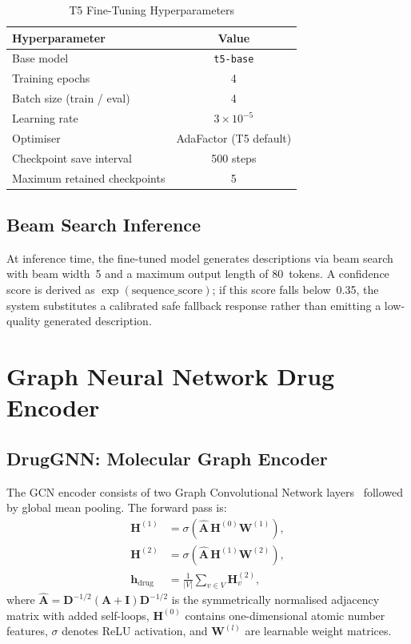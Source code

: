 \documentclass[12pt,a4paper,oneside]{report}
\begin{document}
\begin{table}[htbp]
\centering
\caption{T5 Fine-Tuning Hyperparameters}
\label{tab:t5hparams}
\begin{tabular}{lc}
\toprule
\textbf{Hyperparameter} & \textbf{Value} \\
\midrule
Base model                    & \texttt{t5-base}              \\
Training epochs               & 4                             \\
Batch size (train / eval)     & 4                             \\
Learning rate                 & $3 \times 10^{-5}$            \\
Optimiser                     & AdaFactor (T5 default)        \\
Checkpoint save interval      & 500 steps                     \\
Maximum retained checkpoints  & 5                             \\
\bottomrule
\end{tabular}
\end{table}

\subsection{Beam Search Inference}

At inference time, the fine-tuned model generates descriptions via beam search with beam
width~5 and a maximum output length of 80~tokens. A confidence score is derived as
$\exp(\text{sequence\_score})$; if this score falls below~0.35, the system substitutes a
calibrated safe fallback response rather than emitting a low-quality generated description.

\section{Graph Neural Network Drug Encoder}

\subsection{DrugGNN: Molecular Graph Encoder}

The GCN encoder consists of two Graph Convolutional Network layers~\cite{kipf2016semi}
followed by global mean pooling. The forward pass is:
\begin{align}
  \mathbf{H}^{(1)} &= \sigma\!\left(\hat{\mathbf{A}}\,\mathbf{H}^{(0)}\mathbf{W}^{(1)}\right),
  \label{eq:gcn1}\\
  \mathbf{H}^{(2)} &= \sigma\!\left(\hat{\mathbf{A}}\,\mathbf{H}^{(1)}\mathbf{W}^{(2)}\right),
  \label{eq:gcn2}\\
  \mathbf{h}_{\text{drug}} &= \frac{1}{|V|}\sum_{v \in V}\mathbf{H}^{(2)}_v,
  \label{eq:pool}
\end{align}
where $\hat{\mathbf{A}} = \mathbf{D}^{-1/2}(\mathbf{A}+\mathbf{I})\mathbf{D}^{-1/2}$
is the symmetrically normalised adjacency matrix with added self-loops, $\mathbf{H}^{(0)}$
contains one-dimensional atomic number features, $\sigma$ denotes ReLU activation, and
$\mathbf{W}^{(l)}$ are learnable weight matrices.
\end{document}
